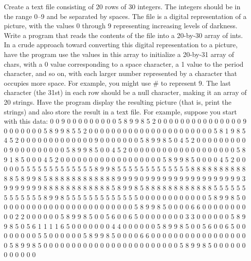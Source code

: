 \begin{question}
Create a text file consisting of 20 rows of 30 integers. The integers should be in the range
0–9 and be separated by spaces. The file is a digital representation of a picture, with
the values 0 through 9 representing increasing levels of darkness. Write a program that
reads the contents of the file into a 20-by-30 array of ints. In a crude approach toward
converting this digital representation to a picture, have the program use the values
in this array to initialize a 20-by-31 array of chars, with a 0 value corresponding to a
space character, a 1 value to the period character, and so on, with each larger number
represented by a character that occupies more space. For example, you might use # to
represent 9. The last character (the 31st) in each row should be a null character, making
it an array of 20 strings. Have the program display the resulting picture (that is, print the
strings) and also store the result in a text file. For example, suppose you start with this
data:
0 0 9 0 0 0 0 0 0 0 0 0 5 8 9 9 8 5 2 0 0 0 0 0 0 0 0 0 0 0
0 0 0 0 9 0 0 0 0 0 0 0 5 8 9 9 8 5 5 2 0 0 0 0 0 0 0 0 0 0
0 0 0 0 0 0 0 0 0 0 0 0 5 8 1 9 8 5 4 5 2 0 0 0 0 0 0 0 0 0
0 0 0 0 9 0 0 0 0 0 0 0 5 8 9 9 8 5 0 4 5 2 0 0 0 0 0 0 0 0
0 0 9 0 0 0 0 0 0 0 0 0 5 8 9 9 8 5 0 0 4 5 2 0 0 0 0 0 0 0
0 0 0 0 0 0 0 0 0 0 0 0 5 8 9 1 8 5 0 0 0 4 5 2 0 0 0 0 0 0
0 0 0 0 0 0 0 0 0 0 0 0 5 8 9 9 8 5 0 0 0 0 4 5 2 0 0 0 0 0
5 5 5 5 5 5 5 5 5 5 5 5 5 8 9 9 8 5 5 5 5 5 5 5 5 5 5 5 5 5
8 8 8 8 8 8 8 8 8 8 8 8 5 8 9 9 8 5 8 8 8 8 8 8 8 8 8 8 8 8
9 9 9 9 0 9 9 9 9 9 9 9 9 9 9 9 9 9 9 9 9 9 3 9 9 9 9 9 9 9
8 8 8 8 8 8 8 8 8 8 8 8 5 8 9 9 8 5 8 8 8 8 8 8 8 8 8 8 8 8
5 5 5 5 5 5 5 5 5 5 5 5 5 8 9 9 8 5 5 5 5 5 5 5 5 5 5 5 5 5
0 0 0 0 0 0 0 0 0 0 0 0 5 8 9 9 8 5 0 0 0 0 0 0 0 0 0 0 0 0
0 0 0 0 0 0 0 0 0 0 0 0 5 8 9 9 8 5 0 0 0 0 6 6 0 0 0 0 0 0
0 0 0 0 2 2 0 0 0 0 0 0 5 8 9 9 8 5 0 0 5 6 0 0 6 5 0 0 0 0
0 0 0 0 3 3 0 0 0 0 0 0 5 8 9 9 8 5 0 5 6 1 1 1 1 6 5 0 0 0
0 0 0 0 4 4 0 0 0 0 0 0 5 8 9 9 8 5 0 0 5 6 0 0 6 5 0 0 0 0
0 0 0 0 5 5 0 0 0 0 0 0 5 8 9 9 8 5 0 0 0 0 6 6 0 0 0 0 0 0
0 0 0 0 0 0 0 0 0 0 0 0 5 8 9 9 8 5 0 0 0 0 0 0 0 0 0 0 0 0
0 0 0 0 0 0 0 0 0 0 0 0 5 8 9 9 8 5 0 0 0 0 0 0 0 0 0 0 0 0
\end{question}

